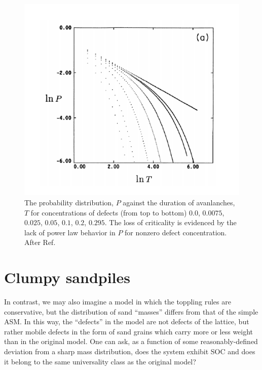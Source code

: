 \documentclass[aps,prb,reprint,superscriptaddress]{revtex4-2}
\begin{document}
\begin{figure}
\includegraphics{defects}
\caption{\label{fig:defects} The probability distribution, $P$ against the duration of avanlanches, $T$ for concentrations of defects (from top to bottom) $0.0$, $0.0075$, $0.025$, $0.05$, $0.1$, $0.2$, $0.295$. The loss of criticality is evidenced by the lack of power law behavior in $P$ for nonzero defect concentration. After Ref.~}
\end{figure}

\section{Clumpy sandpiles}

In contrast, we may also imagine a model in which the toppling rules are conservative, but the distribution of sand ``masses'' differs from that of the simple ASM. In this way, the ``defects'' in the model are not defects of the lattice, but rather mobile defects in the form of sand grains which carry more or less weight than in the original model. One can ask, as a function of some reasonably-defined deviation from a sharp mass distribution, does the system exhibit SOC and does it belong to the same universality class as the original model?
\end{document}
